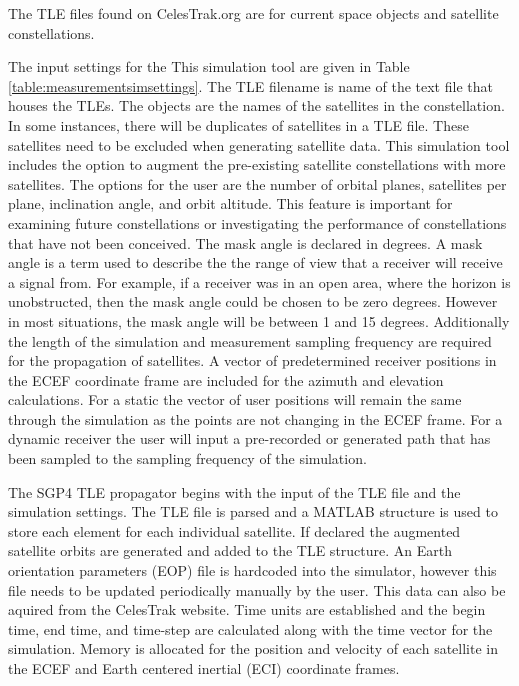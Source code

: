 \documentclass[12pt]{report}
\begin{document}
The TLE files found on CelesTrak.org are for current space objects and satellite constellations. 

The input settings for the This simulation tool are given in Table \ref{table:measurementsimsettings}. The TLE filename is name of the text file that houses the TLEs. The objects are the names of the satellites in the constellation. In some instances, there will be duplicates of satellites in a TLE file. These satellites need to be excluded when generating satellite data. This simulation tool includes the option to augment the pre-existing satellite constellations with more satellites. The options for the user are the number of orbital planes, satellites per plane, inclination angle, and orbit altitude. This feature is important for examining future constellations or investigating the performance of constellations that have not been conceived. The mask angle is declared in degrees. A mask angle is a term used to describe the the range of view that a receiver will receive a signal from. For example, if a receiver was in an open area, where the horizon is unobstructed, then the mask angle could be chosen to be zero degrees. However in most situations, the mask angle will be between 1 and 15 degrees. Additionally the length of the simulation and measurement sampling frequency are required for the propagation of satellites. A vector of predetermined receiver positions in the ECEF coordinate frame are included for the azimuth and elevation calculations. For a static the vector of user positions will remain the same through the simulation as the points are not changing in the ECEF frame. For a dynamic receiver the user will input a pre-recorded or generated path that has been sampled to the sampling frequency of the simulation.

The SGP4 TLE propagator begins with the input of the TLE file and the simulation settings. The TLE file is parsed and a MATLAB structure is used to store each element for each individual satellite. If declared the augmented satellite orbits are generated and added to the TLE structure. An Earth orientation parameters (EOP) file is hardcoded into the simulator, however this file needs to be updated periodically manually by the user. This data can also be aquired from the CelesTrak website. Time units are established and the begin time, end time, and time-step are calculated along with the time vector for the simulation. Memory is allocated for the position and velocity of each satellite in the ECEF and Earth centered inertial (ECI) coordinate frames.
\end{document}

